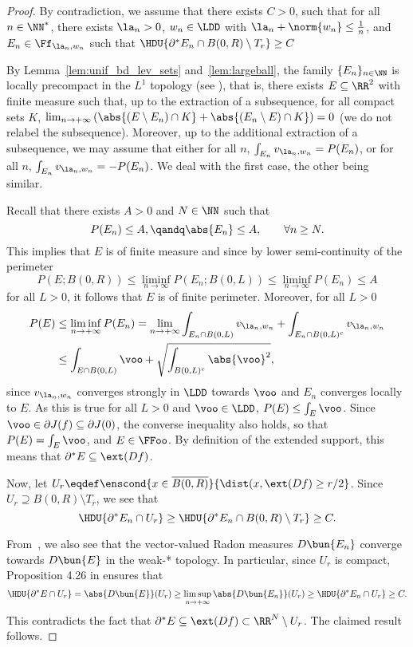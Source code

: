 \begin{proof}
  By contradiction, we assume that there exists $C>0$, such that for all $n\in\NN^*$, there exists $\la_n>0$, $w_n\in\LDD$ with $\la_n+\norm{w_n}\leq \frac{1}{n}$, and $E_n\in \Ff_{\la_n,w_n}$ such that  $\HDU{\partial^*E_n\cap B(0,R) \setminus T_r}\geq C$

  By Lemma~\ref{lem:unif_bd_lev_sets} and~\ref{lem:largeball}, the family $\{E_n\}_{n\in\NN}$ is {\color{blue} locally precompact in the $L^1$ topology (see \cite[Cor. 12.27]{maggi2012sets}), that is, there exists $E\subseteq \RR^2$ with finite measure such that, up to the extraction of a subsequence, for all compact sets $K$, $\lim_{n\to +\infty} \left(\abs{(E\setminus E_n)\cap K}+\abs{(E_n\setminus E)\cap K}\right)=0$ (we do not relabel the subsequence).} Moreover, up to the additional extraction of a subsequence, we may assume that either for all $n$, $\int_{E_n}v_{\la_n,w_n} =P(E_n)$, or for all $n$,
$\int_{E_n}v_{\la_n,w_n} =-P(E_n)$. We deal with the first case, the other being similar.

Recall that there exists $A>0$ and $N\in\NN$ such that
$$
P(E_n)\leq A, \qandq \abs{E_n}\leq A, \qquad\forall n\geq N.
$$
This implies that $E$ is of finite measure and since by lower semi-continuity of the perimeter
$$
P(E; B(0,R))\leq \liminf_{n\to\infty} P(E_n; B(0,L)) \leq \liminf_{n\to\infty} P(E_n) \leq A
$$
for all  $L>0$, it follows that $E$ is of finite perimeter. Moreover, for all $L>0$
\begin{align*}
  P(E)&\leq \liminf_{n\to +\infty}P(E_n)=\lim_{n\to+\infty}\int_{E_n\cap B(0,L)}v_{\la_n,w_n} + \int_{E_n\cap B(0,L)^c}v_{\la_n,w_n}  \\
  &\leq \int_{E\cap B(0,L)}\voo + \sqrt{\int_{B(0,L)^c}\abs{\voo}^2},
\end{align*}
 since $v_{\la_n,w_n}$ converges strongly in $\LDD$ towards $\voo$ and $E_n$ converges locally to $E$. As this is true for all $L>0$ and $\voo \in \LDD$, $P(E)\leq \int_E \voo$. Since $\voo\in \partial J(f)\subseteq \partial J(0)$, the converse inequality also holds, so that $P(E)=\int_E\voo$,  and $E\in \FFoo$. By definition of the extended support, this means that $\partial^*E\subseteq \ext(Df)$.

 
Now, let $U_r\eqdef\enscond{x\in \overline{B(0,R)}}{\dist(x,\ext(Df)\geq r/2}$. Since $U_r\supseteq B(0,R)\setminus T_r$, we see that
\begin{equation*}
\HDU{\partial^*E_n\cap U_r}\geq \HDU{\partial^*E_n\cap B(0,R)\setminus T_r}\geq C.
\end{equation*}
  
From~\cite[Cor. 12.27]{maggi2012sets}, we also see that the vector-valued Radon measures $D\bun{E_n}$ converge towards $D\bun{E}$ in the weak-* topology. In particular, since $U_r$ is compact, Proposition 4.26 in\cite{maggi2012sets} ensures that
\begin{equation}
\HDU{\partial^*E\cap U_r}=\abs{D\bun{E}}(U_r)\geq \limsup_{n\to+\infty}\abs{D\bun{E_n}}(U_r) \geq \HDU{\partial^*E_n\cap U_r}\geq C.
\end{equation}
This contradicts the fact that $\partial^*E\subseteq \ext(Df)\subset \RR^N\setminus U_r$.
The claimed result follows.
\end{proof}



